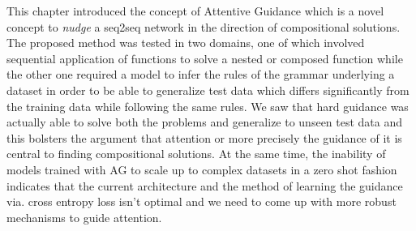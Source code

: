 This chapter introduced the concept of Attentive Guidance which is a novel concept to \textit{nudge} a seq2seq network in the direction of compositional solutions. The proposed method was tested in two domains, one of which involved sequential application of functions to solve a nested or composed function while the other one required a model to infer the rules of the grammar underlying a dataset in order to be able to generalize test data which differs significantly from the training data while following the same rules. We saw that hard guidance was actually able to solve both the problems and generalize to unseen test data and this bolsters the argument that attention or more precisely the guidance of it is central to finding compositional solutions. At the same time, the inability of models trained with AG to scale up to complex datasets in a zero shot fashion indicates that the current architecture and the method of learning the guidance via. cross entropy loss isn't optimal and we need to come up with more robust mechanisms to guide attention.